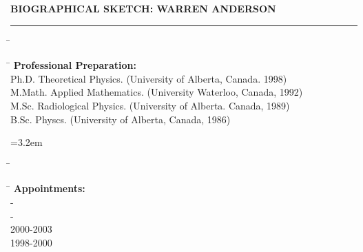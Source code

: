 \documentclass[11pt]{NSF}
\begin{document}

\begin{center}
\large\bfseries BIOGRAPHICAL SKETCH: WARREN ANDERSON
\end{center}
\hrule
\vskip 6pt
\begin{tabbing}
\parbox{\idone}{\hspace{\idone}}\=\parbox{\idtwo}{\hspace{\idtwo}} \= \kill
\textbf{Professional Preparation:}\\
\> { Ph.D.}\> Theoretical Physics. (University of Alberta, Canada. 1998) \\
\> { M.Math.}\> Applied Mathematics. (University Waterloo, Canada, 1992) \\ 
\> { M.Sc.}\> Radiological Physics. (University of Alberta. Canada, 1989) \\ 
\> { B.Sc.}\> Physcs. (University of Alberta, Canada, 1986) 
\end{tabbing}

\begin{tabbing}{\leftmargin=3.2em\itemsep=5pt\topsep=10pt\parsep=0pt}
\parbox{\idone}{\hspace{\idone}}\=\parbox{\idtwo}{\hspace{\idtwo}} \= \kill
\textbf{Appointments:}\\
- \\
- \\
\> {2000-2003} \\
\> {1998-2000}  \\
\end{tabbing}
\end{document}

